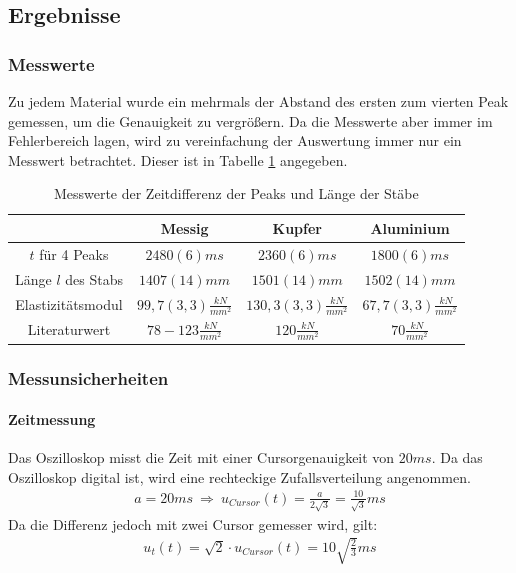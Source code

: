 \documentclass[11pt, a4paper]{article}
\begin{document}
    \subsection{Ergebnisse}
    \subsubsection{Messwerte}
    Zu jedem Material wurde ein mehrmals der Abstand des ersten zum
    vierten Peak gemessen, um die Genauigkeit zu vergrößern. Da die Messwerte aber immer im Fehlerbereich lagen,
    wird zu vereinfachung der Auswertung immer nur ein Messwert betrachtet. Dieser ist in Tabelle \ref{ex:mess1}
    angegeben. 
    \begin{table}[]
        \centering
        \begin{tabular}{c | c | c | c}
           & Messig & Kupfer & Aluminium \\ \hline
            $ t $ für 4 Peaks & $ 2480(6)ms $ & $ 2360(6)ms $ & $ 1800(6)ms $ \\ \hline
            Länge $l$ des Stabs & $1407(14)mm$ & $1501(14)mm$ & $1502(14)mm$ \\ \hline
            Elastizitätsmodul & $99,7(3,3)\frac{kN}{mm^2}$ & $130,3(3,3)\frac{kN}{mm^2}$ & $67,7(3,3)\frac{kN}{mm^2}$ \\ \hline
            Literaturwert & $78-123\frac{kN}{mm^2}$ & $120\frac{kN}{mm^2}$ & $70\frac{kN}{mm^2}$
        \end{tabular}
        \caption{Messwerte der Zeitdifferenz der Peaks und Länge der  Stäbe}
        \label{ex:mess1}
    \end{table}
    \subsubsection{Messunsicherheiten}
    \paragraph{Zeitmessung}
    Das Oszilloskop misst die Zeit mit einer Cursorgenauigkeit von $ 20ms $. Da das Oszilloskop digital ist, wird
    eine rechteckige Zufallsverteilung angenommen.
    \begin{align}
        a = 20ms \ \Rightarrow \ u_{Cursor}(t) = \frac{a}{2 \sqrt{3}} = \frac{10}{\sqrt{3}}ms
    \end{align}
    Da die Differenz jedoch mit zwei Cursor gemesser wird, gilt:
    \begin{align} \label{eqt}
        u_{t}(t) = \sqrt{2} \cdot u_{Cursor}(t) = 10\sqrt{\frac{2}{3}}ms
    \end{align}
\end{document}
